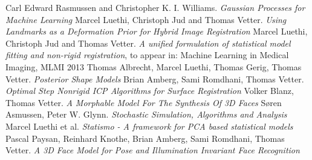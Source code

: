 \begin{thebibliography}{9}

 Carl Edward Rasmussen and Christopher K. I. Williams. \emph{Gaussian Processes for Machine Learning}
 Marcel Luethi, Christoph Jud and Thomas Vetter. \emph{Using Landmarks as a Deformation Prior for Hybrid Image Registration}
 Marcel Luethi, Christoph Jud and Thomas Vetter. \emph{A unified formulation of statistical model fitting and non-rigid registration}, to appear in: Machine Learning in Medical Imaging, MLMI 2013
 Thomas Albrecht, Marcel Luethi, Thomas Gerig, Thomas Vetter. \emph{Posterior Shape Models}
 Brian Amberg, Sami Romdhani, Thomas Vetter. \emph{Optimal Step Nonrigid ICP Algorithms for Surface Registration}
 Volker Blanz, Thomas Vetter. \emph{A Morphable Model For The Synthesis Of 3D Faces}
 S\o ren Asmussen, Peter W. Glynn. \emph{Stochastic Simulation, Algorithms and Analysis}
 Marcel Luethi et al. \emph{Statismo - A framework for PCA based
statistical models}
 Pascal Paysan, Reinhard Knothe, Brian Amberg, Sami Romdhani, Thomas Vetter. \emph{A 3D Face Model for Pose and Illumination Invariant Face
Recognition}

\end{thebibliography}
